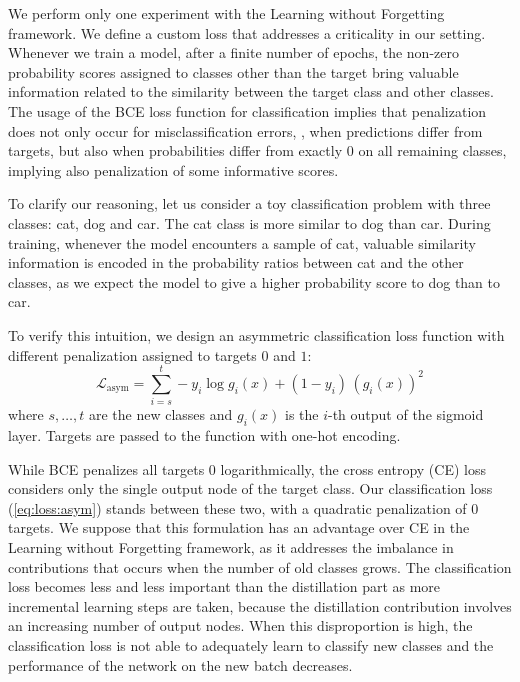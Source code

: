 \documentclass[10pt,twocolumn,letterpaper]{article}
\begin{document}
We perform only one experiment with the Learning without Forgetting framework. We define a custom loss that addresses a criticality in our setting. Whenever we train a model, after a finite number of epochs, the non-zero probability scores assigned to classes other than the target bring valuable information related to the similarity between the target class and other classes. The usage of the BCE loss function for classification implies that penalization does not only occur for misclassification errors, \ie, when predictions differ from targets, but also when probabilities differ from exactly $0$ on all remaining classes, implying also penalization of some informative scores.

To clarify our reasoning, let us consider a toy classification problem with three classes: cat, dog and car. The cat class is more similar to dog than car. During training, whenever the model encounters a sample of cat, valuable similarity information is encoded in the probability ratios between cat and the other classes, as we expect the model to give a higher probability score to dog than to car.

To verify this intuition, we design an asymmetric classification loss function with different penalization assigned to targets $0$ and $1$:
\begin{equation}
    \mathcal{L}_{\text{asym}}=\sum_{i=s}^{t} - y_i \log{g_i(x)} + (1-y_i)\,(g_i(x))^{2} \label{eq:loss:asym}
\end{equation}
where $s, \dots, t$ are the new classes and $g_i(x)$ is the $i$-th output of the sigmoid layer. Targets are passed to the function with one-hot encoding.

While BCE penalizes all targets $0$ logarithmically, the cross entropy (CE) loss considers only the single output node of the target class. Our classification loss (\ref{eq:loss:asym}) stands between these two, with a quadratic penalization of $0$ targets. We suppose that this formulation has an advantage over CE in the Learning without Forgetting framework, as it addresses the imbalance in contributions that occurs when the number of old classes grows. The classification loss becomes less and less important than the distillation part as more incremental learning steps are taken, because the distillation contribution involves an increasing number of output nodes. When this disproportion is high, the classification loss is not able to adequately learn to classify new classes and the performance of the network on the new batch decreases.
\end{document}

